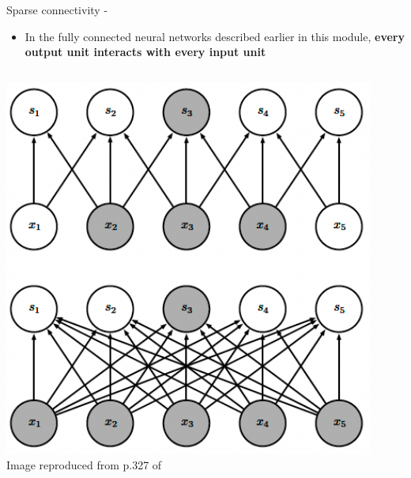 \begin{frame}[t,allowframebreaks]{Sparse connectivity -}

    \begin{itemize}
        \item 
        In the fully connected neural networks described earlier in this module, 
        {\bf every output unit interacts with every input unit} 
    \end{itemize}

    \framebreak

    \begin{columns}
        \begin{column}{0.50\textwidth}
         \begin{center}
          \includegraphics[width=1.0\textwidth]
          {./images/cnn/sparse_connectivity/goodfellow17_sparse_connectivity_from_above_01.png}\\
          {\scriptsize \color{col:attribution} 
          Image reproduced from p.327 of \cite{Goodfellow:2017MITDL}}\\
         \end{center}
        \end{column}
        \begin{column}{0.50\textwidth}
        \end{column}
    \end{columns}


\end{frame}
